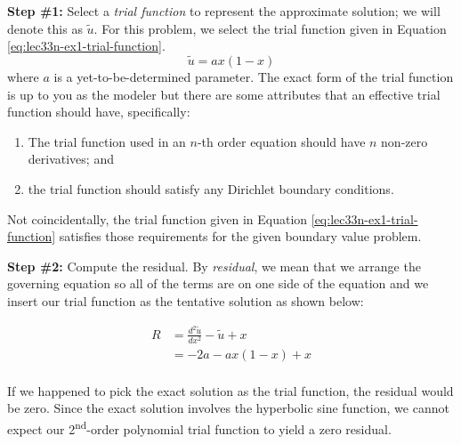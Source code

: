 \vspace{0.25cm}

\noindent\textbf{Step \#1:} Select a \emph{trial function} to represent the approximate solution; we will denote this as $\tilde{u}$.  For this problem, we select the trial function given in Equation \ref{eq:lec33n-ex1-trial-function}.  
\begin{equation}
\tilde{u}=ax(1-x)
\label{eq:lec33n-ex1-trial-function}
\end{equation}
where $a$ is a yet-to-be-determined parameter.  The exact form of the trial function is up to you as the modeler but there are some attributes that an effective trial function should have, specifically:
\begin{enumerate}
\item The trial function used in an $n$-th order equation should have $n$ non-zero derivatives; and
\item the trial function should satisfy any Dirichlet boundary conditions.
\end{enumerate} 
Not coincidentally, the trial function given in Equation \ref{eq:lec33n-ex1-trial-function} satisfies those requirements for the given boundary value problem.

\vspace{0.25cm}

\noindent\textbf{Step \#2:} Compute the residual.  By \emph{residual}, we mean that we arrange the governing equation so all of the terms are on one side of the equation and we insert our trial function as the tentative solution as shown below:

\begin{align*}
R &= \frac{d^2\tilde{u}}{dx^2}-\tilde{u}+x \\
  &=-2a - ax(1-x) + x \\
\end{align*}

If we happened to  pick the exact solution as the trial function, the residual would be zero.  Since the exact solution involves the hyperbolic sine function, we cannot expect our 2\textsuperscript{nd}-order polynomial trial function to yield a zero residual.

